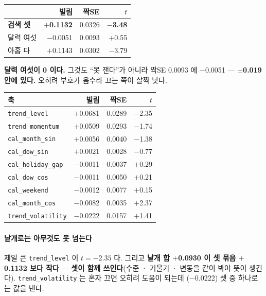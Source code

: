\documentclass[10pt]{article}
\begin{document}
\begin{center}\small
\begin{tabular}{lrrr}
\hline
& 빌림 & 짝SE & $t$ \\
\hline
\textbf{검색 셋} & \textbf{$+$0.1132} & 0.0326 & \textbf{$-$3.48} \\
달력 여섯 & $-$0.0051 & 0.0093 & $+$0.55 \\
\hline
아홉 다 & $+$0.1143 & 0.0302 & $-$3.79 \\
\hline
\end{tabular}
\end{center}

\textbf{달력 여섯이 0 이다.} 그것도 ``못 잰다''가 아니라 짝SE 0.0093 에
$-$0.0051 --- \textbf{$\pm$0.019 안에 있다.} 오히려 부호가 음수라 끄는 쪽이
살짝 낫다.

\begin{center}\footnotesize
\begin{tabular}{lrrr}
\hline
축 & 빌림 & 짝SE & $t$ \\
\hline
\texttt{trend\_level} & $+$0.0681 & 0.0289 & $-$2.35 \\
\texttt{trend\_momentum} & $+$0.0509 & 0.0293 & $-$1.74 \\
\texttt{cal\_month\_sin} & $+$0.0056 & 0.0040 & $-$1.38 \\
\texttt{cal\_dow\_sin} & $+$0.0021 & 0.0028 & $-$0.77 \\
\texttt{cal\_holiday\_gap} & $-$0.0011 & 0.0037 & $+$0.29 \\
\texttt{cal\_dow\_cos} & $-$0.0011 & 0.0050 & $+$0.21 \\
\texttt{cal\_weekend} & $-$0.0012 & 0.0077 & $+$0.15 \\
\texttt{cal\_month\_cos} & $-$0.0082 & 0.0035 & $+$2.37 \\
\texttt{trend\_volatility} & $-$0.0222 & 0.0157 & $+$1.41 \\
\hline
\end{tabular}
\end{center}

\paragraph{낱개로는 아무것도 못 넘는다} 제일 큰 \texttt{trend\_level} 이
$t{=}{-}2.35$ 다. 그리고 \textbf{낱개 합 $+$0.0930 이 셋 묶음 $+$0.1132 보다
작다} --- \textbf{셋이 함께 쓰인다}(수준 · 기울기 · 변동을 같이 봐야 뜻이
생긴다). \texttt{trend\_volatility} 는 혼자 끄면 오히려 도움이 되는데
($-$0.0222) 셋 중 하나로는 값을 낸다.
\end{document}
